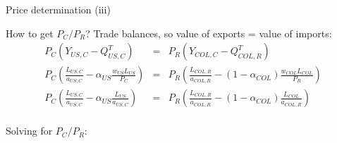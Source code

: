 \documentclass[notes,11pt, aspectratio=169, xcolor=table]{beamer}
\newenvironment{wideitemize}{\itemize\addtolength{\itemsep}{10pt}}{\enditemize}
\begin{document}
\begin{frame}{Price determination (iii)}
    \begin{wideitemize}
    \item How to get $P_C/P_R$? Trade balances, so value of exports = value of imports:
    {\scriptsize
    \begin{eqnarray*}
        P_C ( Y_{US,C} - Q^T_{US,C}) &=& P_R (Y_{COL,C} - Q^T_{COL,R}) \\
        P_C \left( \frac{L_{US,C}}{a_{US,C}} - \alpha_{US} \frac{w_{US} L_{US}}{P_C} \right) &=& P_R \left( \frac{L_{COL,R}}{a_{COL,R}} - (1-\alpha_{COL}) \frac{w_{COL} L_{COL}}{P_R} \right) \\
        P_C \left( \frac{L_{US,C}}{a_{US,C}} - \alpha_{US} \frac{L_{US}}{a_{US,C}} \right) &=& P_R \left( \frac{L_{COL,R}}{a_{COL,R}} - (1-\alpha_{COL}) \frac{L_{COL}}{a_{COL,R}} \right) \\ 
    \end{eqnarray*}
    }
    \normalsize
    \item Solving for $P_C/P_R$:
    \begin{center}
    \end{center}
        
    \end{wideitemize}
\end{frame}
\end{document}
